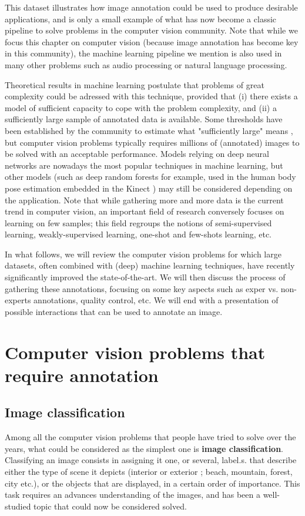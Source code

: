 This dataset illustrates how image annotation could be used to produce desirable applications, and is only a small example of what has now become a classic pipeline to solve problems in the computer vision community. Note that while we focus this chapter on computer vision (because image annotation has become key in this community), the machine learning pipeline we mention is also used in many other problems such as audio processing or natural language processing. 

Theoretical results in machine learning postulate that problems of great complexity could be adressed with this technique, provided that (i) there exists a model of sufficient capacity to cope with the problem complexity, and (ii) a sufficiently large sample of annotated data is available. Some thresholds have been established by the community to estimate what "sufficiently large" means \cite{blabla}, but computer vision problems typically requires millions of (annotated) images to be solved with an acceptable performance. Models relying on deep neural networks are nowadays the most popular techniques in machine learning, but other models (such as deep random forests for example, used in the human body pose estimation embedded in the Kinect \cite{blabla}) may still be considered depending on the application. Note that while gathering more and more data is the current trend in computer vision, an important field of research conversely focuses on learning on few samples; this field regroups the notions of semi-supervised learning, weakly-supervised learning, one-shot and few-shots learning, etc. 

In what follows, we will review the computer vision problems for which large datasets, often combined with (deep) machine learning techniques, have recently significantly improved the state-of-the-art. We will then discuss the process of gathering these annotations, focusing on some key aspects such as exper vs. non-experts annotations, quality control, etc. We will end with a presentation of possible interactions that can be used to annotate an image. 

\section{Computer vision problems that require annotation}
\label{sec:cv_annot} 

\subsection{Image classification} 
Among all the computer vision problems that people have tried to solve over the years, what could be considered as the simplest one is \textbf{image classification}. Classifying an image consists in assigning it one, or several, label.s. that describe either the type of scene it depicts (interior or exterior ; beach, mountain, forest, city etc.), or the objects that are displayed, in a certain order of importance. This task requires an advances understanding of the images, and has been a well-studied topic that could now be considered solved. 

